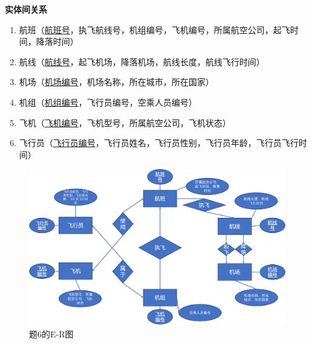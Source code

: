 \documentclass[12pt]{article} %
\makeatletter
\theoremstyle{definition}
\newenvironment{proof}[1][\protect\proofname]{\par
\normalfont\topsep6\p@\@plus6\p@\relax
\trivlist
\itemindent\parindent
\item[\hskip\labelsep
\scshape
#1]\ignorespaces
}{%
\endtrivlist\@endpefalse
}
\renewcommand{\proofname}{\it{解答}}
\makeatother
\begin{document}
\begin{proof}
\textbf{实体间关系}
\begin{enumerate}
  \item 航班（\uline{航班号}，执飞航线号，机组编号，飞机编号，所属航空公司，起飞时间，降落时间）
  \item 航线（\uline{航线号}，起飞机场，降落机场，航线长度，航线飞行时间）
  \item 机场（\uline{机场编号}，机场名称，所在城市，所在国家）
  \item 机组（\uline{机组编号}，飞行员编号，空乘人员编号）
  \item 飞机（\uline{飞机编号}，飞机型号，所属航空公司，飞机状态）
  \item 飞行员（\uline{飞行员编号}，飞行员姓名，飞行员性别，飞行员年龄，飞行员飞行时间）
\end{enumerate}

\begin{figure}[H]
  \centering
  \includegraphics[width=1\textwidth]{./figs/6.1.png}
  \caption{题6的E-R图}
\end{figure}

\end{proof}

\newpage


\end{document}
